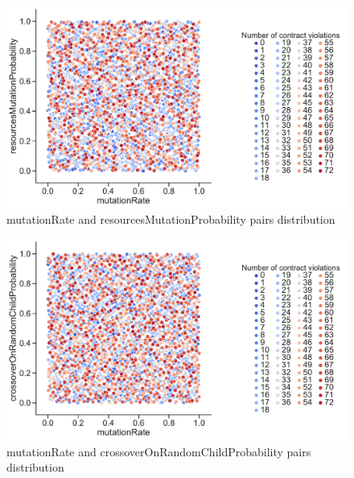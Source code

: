 \begin{figure}
	\centering
	\includegraphics[width=\textwidth]{images/PairsDistr/mutationRate_resourcesMutationProbability.pdf}
	\caption[mutationRate and resourcesMutationProbability pairs distribution]{mutationRate and resourcesMutationProbability pairs distribution}
	\label{fig:mutationRate_resourcesMutationProbability_pair}
\end{figure}
\clearpage
\begin{figure}
	\centering
	\includegraphics[width=\textwidth]{images/PairsDistr/mutationRate_crossoverOnRandomChildProbability.pdf}
	\caption[mutationRate and crossoverOnRandomChildProbability pairs distribution]{mutationRate and crossoverOnRandomChildProbability pairs distribution}
	\label{fig:mutationRate_crossoverOnRandomChildProbability_pair}
\end{figure}
\clearpage
